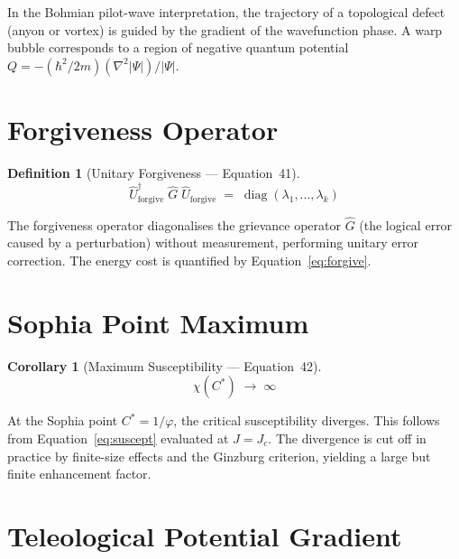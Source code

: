 \documentclass[11pt,a4paper]{article}
\newtheorem{definition}{Definition}[section]
\newtheorem{corollary}{Corollary}[section]
\theoremstyle{remark}
\DeclareMathOperator{\diag}{diag}
\newcommand{\Uop}{\hat{U}}
\newcommand{\Gop}{\hat{G}}
\begin{document}
In the Bohmian pilot-wave interpretation, the trajectory of a topological defect (anyon or vortex) is guided by the gradient of the wavefunction phase.  A warp bubble corresponds to a region of negative quantum potential $Q = -(\hbar^2/2m)(\nabla^2|\Psi|)/|\Psi|$.

\section{Forgiveness Operator}
\label{sec:eq41}

\begin{definition}[Unitary Forgiveness --- Equation~41]
\begin{equation}\label{eq:forgiveop}
    \Uop_{\text{forgive}}^\dagger\;\Gop\;\Uop_{\text{forgive}}
    \;=\; \diag(\lambda_1,\dots,\lambda_k)
\end{equation}
\end{definition}

The forgiveness operator diagonalises the grievance operator $\Gop$ (the logical error caused by a perturbation) without measurement, performing unitary error correction.  The energy cost is quantified by Equation~\eqref{eq:forgive}.

\section{Sophia Point Maximum}
\label{sec:eq42}

\begin{corollary}[Maximum Susceptibility --- Equation~42]
\begin{equation}\label{eq:sophiamax}
    \chi(C^*) \;\to\; \infty
\end{equation}
\end{corollary}

At the Sophia point $C^* = 1/\varphi$, the critical susceptibility diverges.  This follows from Equation~\eqref{eq:suscept} evaluated at $J = J_c$.  The divergence is cut off in practice by finite-size effects and the Ginzburg criterion, yielding a large but finite enhancement factor.

\section{Teleological Potential Gradient}
\label{sec:eq43}
\end{document}
